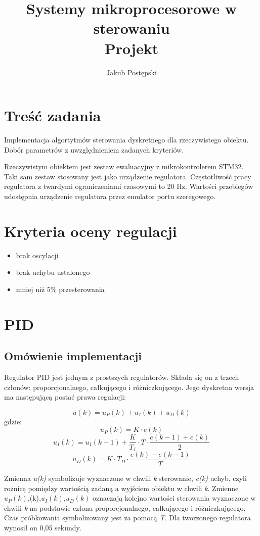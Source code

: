 \documentclass[a4paper, 10pt]{article}
\author{Jakub Postępski}
\title{Systemy mikroprocesorowe w sterowaniu \\ Projekt}
\begin{document}
\maketitle

\section{Treść zadania}
Implementacja algortytmów sterowania dyskretnego dla rzeczywistego obiektu. Dobór parametrów z uwzględnieniem zadanych kryteriów. 

Rzeczywistym obiektem jest zestaw ewaluacyjny z mikrokontrolerem STM32. Taki sam zestaw stosowany jest jako urządzenie regulatora. Częstotliwość pracy regulatora z twardymi ograniczeniami czasowymi to 20 Hz. Wartości przebiegów udostępnia urządzenie regulatora przez emulator portu szeregowego.


\section{Kryteria oceny regulacji}

\begin{itemize}
\item{brak oscylacji }
\item{brak uchybu ustalonego }
\item{mniej niż $5\%$ przesterowania }
\end{itemize}

\section{PID}
\subsection{Omówienie implementacji}

Regulator PID jest jednym z prostszych regulatorów. Składa się on z trzech członów: proporcjonalnego, całkującego i różniczkującego.
Jego dyskretna wersja ma następującą postać prawa regulacji:

\[u(k)=u_{P}(k)+u_{I}(k)+u_{D}(k)\]
gdzie:
\[u_{P}(k)=K \cdot e(k)\]
\[u_{I}(k)=u_{I}(k-1)+\frac{K}{T_{I}} \cdot T\cdot\frac{e(k-1)+e(k)}{2}\]
\[u_{D}(k)=K \cdot T_{D} \cdot \frac {e(k)-e(k-1)}{T}\]

Zmienna \textit{u(k)} symbolizuje wyznaczone w chwili \textit{k} sterowanie, \textit{e(k)} uchyb, czyli rożnicę pomiędzy wartością zadaną a wyjściem obiektu w chwili \textit{k}. Zmienne $u_{P}(k)$,(k),$u_{I}(k)$,$u_{D}(k)$ oznaczają kolejno wartości sterowania wyznaczone w chwili \textit{k} na podstawie członu proporcjonalnego, całkującego i różniczkującego. Czas próbkowania symbolizowany jest za pomocą \textit{T}. Dla tworzonego regulatora wynosił on 0,05 sekundy.
\end{document}
